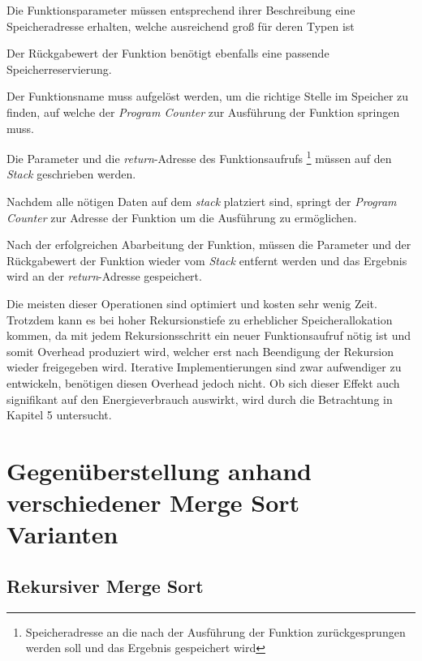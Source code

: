 \begin{aligneddescription}
\item Die Funktionsparameter müssen entsprechend ihrer Beschreibung eine Speicheradresse  erhalten, welche ausreichend groß für deren Typen ist
\item Der Rückgabewert der Funktion benötigt ebenfalls eine passende Speicherreservierung.
\item Der Funktionsname muss aufgelöst werden, um die richtige Stelle im Speicher zu finden, auf welche der \emph{Program Counter} zur Ausführung der Funktion springen muss.
\item Die Parameter und die \emph{return}-Adresse des Funktionsaufrufs \footnote{Speicheradresse an die nach der Ausführung der Funktion zurückgesprungen werden soll und das Ergebnis gespeichert wird} müssen auf den \emph{Stack} geschrieben werden.
\item Nachdem alle nötigen Daten auf dem \emph{stack} platziert sind, springt der \emph{Program Counter} zur Adresse der Funktion um die Ausführung zu ermöglichen.
\item Nach der erfolgreichen Abarbeitung der Funktion, müssen die Parameter und der Rückgabewert der Funktion wieder vom \emph{Stack} entfernt werden und das Ergebnis wird an der \emph{return}-Adresse gespeichert. 
\end{aligneddescription}

Die meisten dieser Operationen sind optimiert und kosten sehr wenig Zeit. Trotzdem kann es bei hoher Rekursionstiefe zu erheblicher Speicherallokation kommen, da mit jedem Rekursionsschritt ein neuer Funktionsaufruf nötig ist und somit Overhead produziert wird, welcher erst nach Beendigung der Rekursion wieder freigegeben wird. Iterative Implementierungen sind zwar aufwendiger zu entwickeln, benötigen diesen Overhead jedoch nicht. Ob sich dieser Effekt auch signifikant auf den Energieverbrauch auswirkt, wird durch die Betrachtung in Kapitel 5 untersucht.

\section{Gegenüberstellung anhand verschiedener Merge Sort Varianten}
\subsection{Rekursiver Merge Sort}

